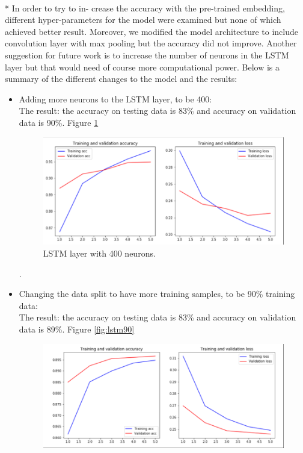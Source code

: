 \\* In order to try to in- crease the accuracy with the pre-trained embedding, different hyper-parameters for the model were examined but none of which achieved better result. Moreover, we modified the model architecture to include convolution layer with max pooling but the accuracy did not improve. Another suggestion for future work is to increase the number of neurons in the LSTM layer but that would need of course more computational power. Below is a summary of the different changes to the model and the results:
\begin{itemize}
\item Adding more neurons to the LSTM layer, to be 400:
\\The result: the accuracy on testing data is 83\% and accuracy on validation data is 90\%. Figure \ref{fig:lstm400}
\begin{figure}[h!]
  \includegraphics[width=\linewidth]{LSTM400.png}
  \caption{LSTM layer with 400 neurons.}
  \label{fig:lstm400}
\end{figure} . 
\item Changing the data split to have more training samples, to be 90\% training data:
\\The result: the accuracy on testing data is 83\% and accuracy on validation data is 89\%. Figure \ref{fig:lstm90}
\begin{figure}[h!]
  \includegraphics[width=\linewidth]{train90.png}

\end{figure}
\end{itemize}
